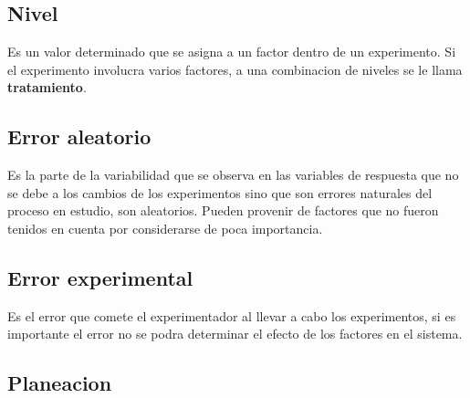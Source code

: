 \documentclass[a4paper]{article}
\begin{document}
\subsection*{Nivel}
Es un valor determinado que se asigna a un factor dentro de un experimento. Si el experimento involucra varios factores,
a una combinacion de niveles se le llama \textbf{tratamiento}.

\subsection*{Error aleatorio}
Es la parte de la variabilidad que se observa en las variables de respuesta que no se debe a los cambios de los 
experimentos sino que son errores naturales del proceso en estudio, son aleatorios. Pueden provenir de factores
que no fueron tenidos en cuenta por considerarse de poca importancia.

\subsection*{Error experimental}
Es el error que comete el experimentador al llevar a cabo los experimentos, si es importante el error no se podra
determinar el efecto de los factores en el sistema.

\subsection*{Planeacion}
\end{document}
